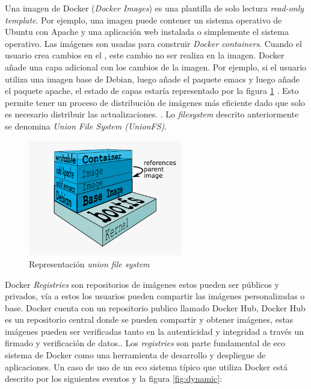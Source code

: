 \documentclass[letter,10pt]{article}
\begin{document}
	Una imagen de Docker (\textit{Docker Images}) es una plantilla de solo lectura \textit{read-only template}. Por ejemplo, una imagen puede contener un sistema operativo de Ubuntu con Apache y una aplicación web instalada o simplemente el sistema operativo. Las imágenes son usadas para construir \emph{Docker containers}. Cuando el usuario crea cambios en el \container, este cambio no ser realiza en la imagen. Docker añade una capa adicional con los cambios de la imagen. \cite{bui2015analysis} Por ejemplo, si el usuario utiliza una imagen base de Debian, luego añade el paquete emacs y luego añade el paquete apache, el estado de capas estaría representado por la figura \ref{fig:arquitectura} \cite{Docker:2015:Online}. Esto permite tener un proceso de distribución de imágenes más eficiente dado que solo es necesario distribuir las actualizaciones. \cite{bui2015analysis}. Lo \textit{filesystem} descrito anteriormente se denomina \textit{Union File System (UnionFS)}.
\begin{figure}[H]
  \centering
  \includegraphics[width=0.6\textwidth]{images/docker-filesystems-multilayer}
    \caption{Representación \textit{union file system}}
    \label{fig:arquitectura}
\end{figure}	
	Docker \textit{Registries} son repositorios de imágenes estos pueden ser públicos y privados, vía a estos los usuarios pueden compartir las imágenes personalizadas o base. Docker cuenta con un repositorio publico llamado Docker Hub, Docker Hub es un repositorio central donde se pueden compartir y obtener imágenes, estas imágenes pueden ser verificadas tanto en la autenticidad y integridad a través un firmado y verificación de datos.\cite{bui2015analysis}. Los \textit{registries} son parte fundamental de eco sistema de Docker como una herramienta de desarrollo y despliegue de aplicaciones. Un caso de uso de un eco sistema típico que utiliza Docker está descrito por los siguientes eventos y la figura \ref{fig:dynamic}:
\end{document}

